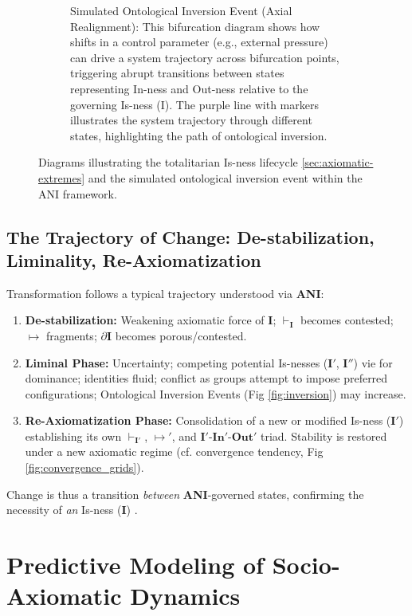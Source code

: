 \documentclass{article}
\newcommand{\ANI}{\textbf{ANI}}             %
\newcommand{\Isness}{\mathbf{I}}            %
\newcommand{\Inness}{\mathbf{In}}           %
\newcommand{\Outness}{\mathbf{Out}}         %
\newcommand{\enactment}{\ensuremath{\mapsto}} %
\newcommand{\validates}[1]{\ensuremath{\vdash_{#1}}} %
\newcommand{\boundary}[1]{\ensuremath{\partial #1}} %
\begin{document}
\begin{figure}[htbp]
\begin{subfigure}[b]{0.65\textwidth}
        \caption{Simulated Ontological Inversion Event (Axial Realignment): This bifurcation diagram shows how shifts in a control parameter (e.g., external pressure) can drive a system trajectory across bifurcation points, triggering abrupt transitions between states representing In-ness and Out-ness relative to the governing Is-ness (I). The purple line with markers illustrates the system trajectory through different states, highlighting the path of ontological inversion.}
        \label{fig:ontological_inversion}
    \end{subfigure}
    \caption{Diagrams illustrating the totalitarian Is-ness lifecycle \ref{sec:axiomatic-extremes} and the simulated ontological inversion event within the ANI framework.}
    \label{fig:combined_2}
\end{figure}

\subsection{The Trajectory of Change: De-stabilization, Liminality, Re-Axiomatization}

Transformation follows a typical trajectory understood via \ANI{}:
\begin{enumerate}
    \item \textbf{De-stabilization:} Weakening axiomatic force of $\Isness$; $\validates{\Isness}$ becomes contested; $\enactment$ fragments; $\boundary{\Isness}$ becomes porous/contested.
    \item \textbf{Liminal Phase:} Uncertainty; competing potential Is-nesses ($\Isness'$, $\Isness''$) vie for dominance; identities fluid; conflict as groups attempt to impose preferred configurations; Ontological Inversion Events (Fig \ref{fig:inversion}) may increase.
    \item \textbf{Re-Axiomatization Phase:} Consolidation of a new or modified Is-ness ($\Isness'$) establishing its own $\validates{\Isness'}$, $\enactment'$, and $\Isness'$-$\Inness'$-$\Outness'$ triad. Stability is restored under a new axiomatic regime (cf. convergence tendency, Fig \ref{fig:convergence_grids}).
\end{enumerate}
Change is thus a transition \textit{between} \ANI{}-governed states, confirming the necessity of \textit{an} Is-ness ($\Isness$) \citep{Luhmann1995}.

\section{Predictive Modeling of Socio-Axiomatic Dynamics}\label{sec:modeling}
\end{document}

